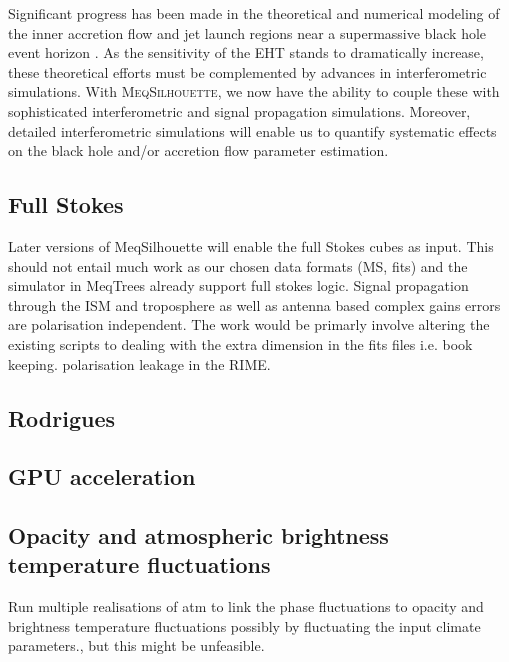 Significant progress has been made in the theoretical and numerical modeling of the inner accretion flow and jet launch regions near a supermassive black hole event horizon
\citep[e.g.][]{Zanna_2007,Etienne_2010,Dexter_2013,Moscibrodzka_2014, McKinney_2014}. As the sensitivity of the EHT stands to dramatically increase, these theoretical efforts must be complemented by advances in interferometric simulations. With \textsc{MeqSilhouette}, we now have the ability to couple these with sophisticated interferometric and signal propagation simulations.  Moreover, detailed interferometric simulations will enable us to quantify systematic effects on the black hole and/or accretion flow parameter estimation.

\subsection{Full Stokes}

Later versions of {\sc MeqSilhouette} will enable the full Stokes cubes as input. This should not entail much work as our chosen data formats (MS, {\sc fits}) and the simulator in {\sc MeqTrees} already support full stokes logic. Signal propagation through the ISM and troposphere as well as antenna based complex gains errors are polarisation independent. The work would be primarly involve altering the existing scripts to dealing with the extra dimension in the {\sc fits} files i.e. book keeping. 
polarisation leakage in the RIME.


\subsection{Rodrigues}

\subsection{GPU acceleration}


\subsection{Opacity and atmospheric brightness temperature fluctuations}

Run multiple realisations of atm to link the phase fluctuations to opacity and brightness temperature fluctuations possibly by fluctuating the input climate parameters., but this might be unfeasible.


